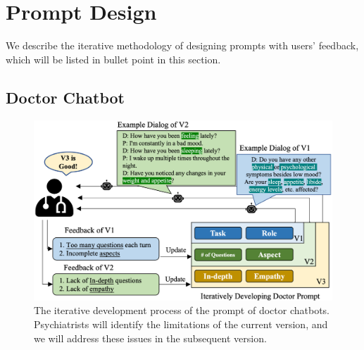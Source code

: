 \section{Prompt Design}
\label{sec:method}
We describe the iterative methodology of designing prompts with users' feedback, which will be listed in bullet point in this section. 



\subsection{Doctor Chatbot}

\begin{figure}[th]
	\centering
	\includegraphics[width=\linewidth]{Figures/doctor_prompt_design.png}
	\caption{The iterative development process of the prompt of doctor chatbots. Psychiatrists will identify the limitations of the current version, and we will address these issues in the subsequent version.}
	\label{fig:doc_prompt_design}
\end{figure}

